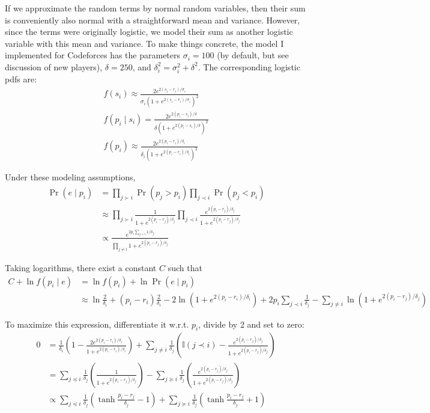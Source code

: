 \documentclass{article}
\begin{document}
If we approximate the random terms by normal random variables, then their sum is conveniently also normal with a straightforward mean and variance. However, since the terms were originally logistic, we model their sum as another logistic variable with this mean and variance. To make things concrete, the model I implemented for Codeforces has the parameters $\sigma_i = 100$ (by default, but see discussion of new players), $\delta = 250$, and $\delta_i^2 = \sigma_i^2 + \delta^2$. The corresponding logistic pdfs are:
\begin{align}
f(s_i) \approx \frac { 2e^{2(s_i-r_i)/\sigma_i} } { \sigma_i\left(1 + e^{2(s_i-r_i)/\sigma_i} \right)^2 }
\\f(p_i\mid s_i) = \frac { 2e^{2(p_i-s_i)/\delta} } { \delta\left(1 + e^{2(p_i-s_i)/\delta} \right)^2}
\\f(p_i) \approx \frac { 2e^{2(p_i-r_i)/\delta_i} } { \delta_i\left(1 + e^{2(p_i-r_i)/\delta_i} \right)^2}
\end{align}

Under these modeling assumptions,
\begin{align}
\Pr(e\mid p_i) &= \prod_{j \succ i} \Pr(p_j > p_i) \prod_{j \prec i} \Pr(p_j < p_i)
\\&\approx \prod_{j \succ i} \frac {1} {1 + e^{2(p_i-r_j)/\delta_j}} \prod_{j \prec i} \frac {e^{2(p_i-r_j)/\delta_j}} {1 + e^{2(p_i-r_j)/\delta_j}}
\\&\propto \frac {e^{2p_i\sum_{j\prec i}1/\delta_j}} {\prod_{j\neq i} 1 + e^{2(p_i-r_j)/\delta_j}}
\end{align}

Taking logarithms, there exist a constant $C$ such that
\begin{align}
C + \ln f(p_i\mid e) &= \ln f(p_i) + \ln \Pr(e\mid p_i)
\\&\approx \ln \frac{2}{\delta_i} + (p_i-r_i)\frac{2}{\delta_i} - 2\ln\left(1 + e^{2(p_i-r_i)/\delta_i} \right) + 2p_i\sum_{j\prec i} \frac{1}{\delta_j} - \sum_{j\neq i} \ln\left(1 + e^{2(p_i-r_j)/\delta_j}\right)
\end{align}

To maximize this expression, differentiate it w.r.t. $p_i$, divide by 2 and set to zero:
\begin{align}
0 &= \frac{1}{\delta_i}\left(1 - \frac {2e^{2(p_i-r_i)/\delta_i}} {1 + e^{2(p_i-r_i)/\delta_i}} \right) + \sum_{j\neq i}\frac{1}{\delta_j}\left(\mathbb{I}(j\prec i) - \frac {e^{2(p_i-r_j)/\delta_j}} {1 + e^{2(p_i-r_j)/\delta_j}} \right)
\\&= \sum_{j\preceq i}\frac{1}{\delta_j}\left(\frac {1} {1 + e^{2(p_i-r_j)/\delta_j}} \right)
	- \sum_{j\succeq i}\frac{1}{\delta_j}\left(\frac {e^{2(p_i-r_j)/\delta_j}} {1 + e^{2(p_i-r_j)/\delta_j}} \right)
\\&\propto \sum_{j\preceq i}\frac{1}{\delta_j}\left( \tanh\frac {p_i - r_j} {\delta_j} - 1 \right) + \sum_{j\succeq i}\frac{1}{\delta_j}\left( \tanh\frac {p_i - r_j} {\delta_j} + 1 \right)
\end{align}
\end{document}
